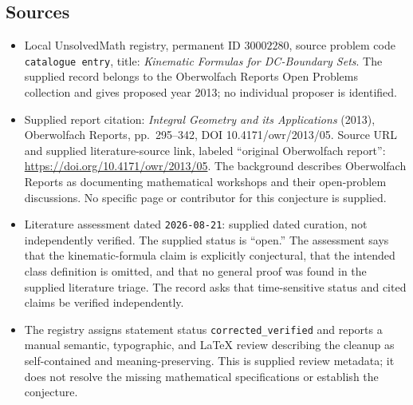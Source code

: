 \documentclass[11pt]{article}
\begin{document}
\subsection{Sources}
\begin{itemize}
\item Local UnsolvedMath registry, permanent ID \(30002280\), source problem code \texttt{catalogue entry}, title: \emph{Kinematic Formulas for DC-Boundary Sets}. The supplied record belongs to the Oberwolfach Reports Open Problems collection and gives proposed year 2013; no individual proposer is identified.
\item Supplied report citation: \emph{Integral Geometry and its Applications} (2013), Oberwolfach Reports, pp.\ 295--342, DOI 10.4171/owr/2013/05. Source URL and supplied literature-source link, labeled ``original Oberwolfach report'': \url{https://doi.org/10.4171/owr/2013/05}. The background describes Oberwolfach Reports as documenting mathematical workshops and their open-problem discussions. No specific page or contributor for this conjecture is supplied.
\item Literature assessment dated \texttt{2026-08-21}: supplied dated curation, not independently verified. The supplied status is ``open.'' The assessment says that the kinematic-formula claim is explicitly conjectural, that the intended class definition is omitted, and that no general proof was found in the supplied literature triage. The record asks that time-sensitive status and cited claims be verified independently.
\item The registry assigns statement status \texttt{corrected\_verified} and reports a manual semantic, typographic, and LaTeX review describing the cleanup as self-contained and meaning-preserving. This is supplied review metadata; it does not resolve the missing mathematical specifications or establish the conjecture.
\end{itemize}
\end{document}
